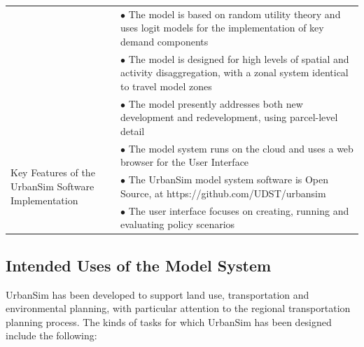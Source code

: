 \begin{table}[htp]
\begin{center}
\begin{tabular}{ p{1.5in}  p{4.4in}  }
& $\bullet$    The model is based on random utility theory and uses logit models for the implementation of key demand components\\
& $\bullet$    The model is designed for high levels of spatial and activity disaggregation, with a zonal system identical to travel model zones\\
& $\bullet$    The model presently addresses both new development and redevelopment, using parcel-level detail\\
\midrule
\multirow[c]{3}{1.5in}{Key Features of the UrbanSim Software Implementation}
&  $\bullet$   The model system runs on the cloud and uses a web browser for the User Interface\\
& $\bullet$  The UrbanSim model system software is Open Source, at https://github.com/UDST/urbansim\\
&  $\bullet$   The user interface focuses on creating, running and evaluating policy scenarios\\
\bottomrule
\end{tabular}
\end{center}
\end{table}

\subsection{Intended Uses of the Model System}

UrbanSim has been developed to support land use, transportation and
environmental planning, with particular attention to the regional
transportation planning process. The kinds of tasks for which UrbanSim
has been designed include the following:

